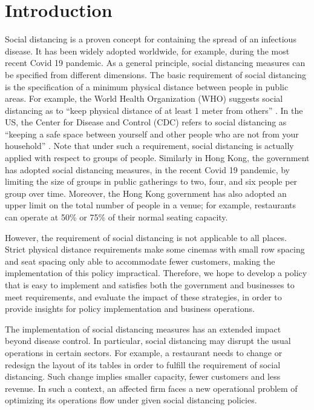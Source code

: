 \section{Introduction}
Social distancing is a proven concept for containing the spread of an infectious disease. It has been widely adopted worldwide, for example, during the most recent Covid 19 pandemic. As a general principle, social distancing measures can be specified from different dimensions. The basic requirement of social distancing is the specification of a minimum physical distance between people in public areas. For example, the World Health Organization (WHO) suggests social distancing as to ``keep physical distance of at least 1 meter from others'' \cite{AdviceforPublic}. In the US, the Center for Disease and Control (CDC) refers to social distancing as ``keeping a safe space between yourself and other people who are not from your household'' \cite{CDC}. 
Note that under such a requirement, social distancing is actually applied with respect to groups of people. Similarly in Hong Kong, the government has adopted social distancing measures, in the recent Covid 19 pandemic, by limiting the size of groups in public gatherings to two, four, and six people per group over time. Moreover, the Hong Kong government has also adopted an upper limit on the total number of people in a venue; for example, restaurants can operate at 50\% or 75\% of their normal seating capacity. 

However, the requirement of social distancing is not applicable to all places. Strict physical distance requirements make some cinemas with small row spacing and seat spacing only able to accommodate fewer customers, making the implementation of this policy impractical. Therefore, we hope to develop a policy that is easy to implement and satisfies both the government and businesses to meet requirements, and evaluate the impact of these strategies, in order to provide insights for policy implementation and business operations.

The implementation of social distancing measures has an extended impact beyond disease control. In particular, social distancing may disrupt the usual operations in certain sectors. For example, a restaurant needs to change or redesign the layout of its tables in order to fulfill the requirement of social distancing. Such change implies smaller capacity, fewer customers and less revenue. In such a context, an affected firm faces a new operational problem of optimizing its operations flow under given social distancing policies.

